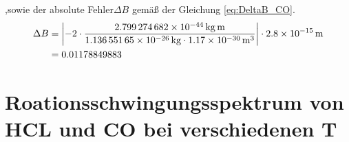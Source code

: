 ,sowie der absolute Fehler$\Delta B$ gemäß der  Gleichung \ref{eq:DeltaB_CO}.  
\begin{align}
\Delta B &= \left|-2\cdot \frac{\SI[mode=math]{2.799274682e-44}{kg.m}}{\SI[mode=math]{1.13655165e-26}{kg}\cdot\SI[mode=math]{1.17e-30}{m^{3}}}\right| \cdot \SI[mode=math]{2.8e-15}{m}
\notag\\
&=0.01178849883\label{eq:DeltaB_CO}
\end{align} 









 

\section{Roationsschwingungsspektrum von HCL und CO bei verschiedenen T}

